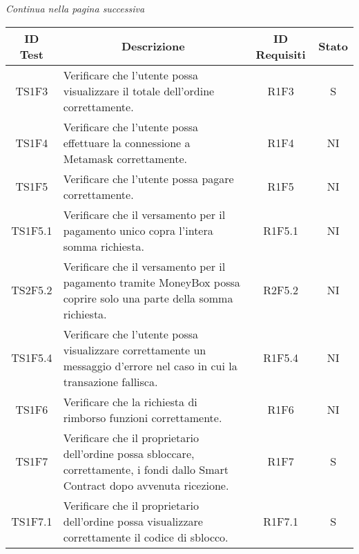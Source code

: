 \begin{center}
  \textit{\small Continua nella pagina successiva}
\end{center}
\begin{table}[H]
  \centering
  \renewcommand{\arraystretch}{1.8}
  \begin{tabular}{c|p{8cm}|c|c}
    \rowcolor[HTML]{125E28}
    \color[HTML]{FFFFFF}\textbf{ID Test}
              & \multicolumn{1}{c}{\color[HTML]{FFFFFF}\textbf{Descrizione}}
              & \color[HTML]{FFFFFF}\textbf{ID Requisiti}
              & \color[HTML]{FFFFFF}\textbf{Stato}                                                                                                                     \\
    \hline
    TS1F3     & Verificare che l'utente possa visualizzare il totale dell'ordine correttamente.                                                        & R1F3     & S \\
    TS1F4     & Verificare che l'utente possa effettuare la connessione a Metamask\glo{} correttamente.                                                & R1F4     & NI \\
    TS1F5     & Verificare che l'utente possa pagare correttamente.                                                                                    & R1F5     & NI \\
    TS1F5.1   & Verificare che il versamento per il pagamento unico copra l'intera somma richiesta.                                                    & R1F5.1   & NI \\
    TS2F5.2   & Verificare che il versamento per il pagamento tramite MoneyBox\glo{} possa coprire solo una parte della somma richiesta.               & R2F5.2   & NI \\
    TS1F5.4   & Verificare che l'utente possa visualizzare correttamente un messaggio d'errore nel caso in cui la transazione fallisca.                & R1F5.4   & NI \\
    TS1F6     & Verificare che la richiesta di rimborso funzioni correttamente.                                                                        & R1F6     & NI \\
    TS1F7     & Verificare che il proprietario dell'ordine possa sbloccare, correttamente, i fondi dallo Smart Contract\glo{} dopo avvenuta ricezione. & R1F7     & S \\
    TS1F7.1   & Verificare che il proprietario dell'ordine possa visualizzare correttamente il codice di sblocco.                                      & R1F7.1   & S \\

\end{tabular}
\end{table}
